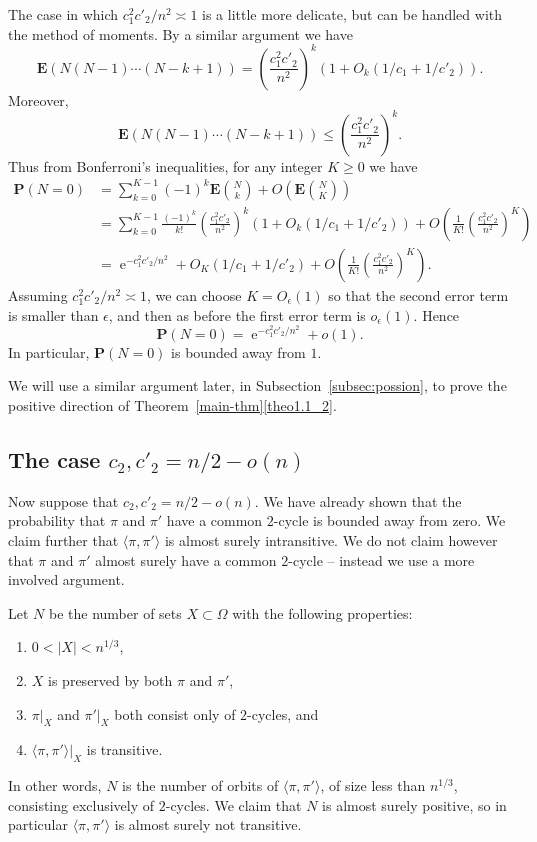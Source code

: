 \documentclass[ALCO,ThmDefs,Unicode,epreuves]{cedram}
\DeclareMathOperator{\expe}{e}
\newcommand{\eps}{\epsilon}
\renewcommand\P{\mathbf{P}}
\newcommand\E{\mathbf{E}}
\newcommand\br[1]{\left({#1}\right)}
\newcommand\pfrac[2]{\br{\frac{#1}{#2}}}
\begin{document}
The case in which $c_1^2 c'_2 / n^2 \asymp 1$ is a little more delicate, but can be handled with the method of moments. By a similar argument we have
\[
 \E (N (N-1) \cdots (N-k+1)) = \pfrac{c_1^2 c'_2}{n^2}^k (1 + O_k(1/c_1 + 1/c'_2)).
\]
Moreover,
\[
 \E (N(N-1) \cdots (N-k+1)) \leq \pfrac{c_1^2 c'_2}{n^2}^k.
\]
Thus from Bonferroni's inequalities, for any integer $K \geq 0$ we have
\begin{align*}
 \P(N = 0)
 &= \sum_{k=0}^{K-1} (-1)^k \E \binom{N}{k} + O\left( \E \binom{N}{K} \right) \\
 &= \sum_{k=0}^{K-1} \frac{(-1)^k}{k!} \pfrac{c_1^2 c'_2}{n^2}^k (1 + O_k(1/c_1 + 1/c'_2)) + O\left( \frac1{K!} \pfrac{c_1^2 c'_2}{n^2}^K \right) \\
 &= \expe^{-c_1^2 c'_2 / n^2} + O_K \left( 1/c_1 + 1/c'_2 \right) + O \left(\frac1{K!} \pfrac{c_1^2 c'_2}{n^2}^K \right).
\end{align*}
Assuming $c_1^2 c'_2 / n^2 \asymp 1$, we can choose $K=O_\eps(1)$ so that the second error term is smaller than $\eps$, and then as before the first error term is $o_\eps(1)$. Hence
\[
 \P(N=0) = \expe^{-c_1^2 c'_2 / n^2} + o(1).
\]
In particular, $\P(N=0)$ is bounded away from $1$.

We will use a similar argument later, in Subsection~\ref{subsec:possion}, to prove the positive direction of Theorem~\ref{main-thm}\eqref{theo1.1_2}.

\subsection{The case \texorpdfstring{$c_2, c'_2 = n/2 - o(n)$}{c2, c2' = n/2 - o(n)}}

Now suppose that $c_2, c'_2 = n/2 - o(n)$. We have already shown that the probability that $\pi$ and $\pi'$ have a common $2$-cycle is bounded away from zero. We claim further that $\langle \pi, \pi'\rangle$ is almost surely intransitive. We do not claim however that $\pi$ and $\pi'$ almost surely have a common $2$-cycle -- instead we use a more involved argument.

Let $N$ be the number of sets $X \subset \Omega$ with the following properties:
\begin{enumerate}
 \item\label{sect2.4_1} $0 < |X| < n^{1/3}$,
 \item\label{sect2.4_2} $X$ is preserved by both $\pi$ and $\pi'$,
 \item\label{sect2.4_3} $\pi|_X$ and $\pi'|_X$ both consist only of $2$-cycles, and
 \item\label{sect2.4_4} $\langle \pi, \pi'\rangle |_X$ is transitive.
\end{enumerate}
In other words, $N$ is the number of orbits of $\langle \pi, \pi'\rangle$, of size less than $n^{1/3}$, consisting exclusively of $2$-cycles. We claim that $N$ is almost surely positive, so in particular $\langle \pi, \pi'\rangle$ is almost surely not transitive.
\end{document}
